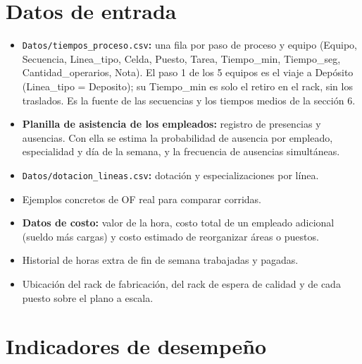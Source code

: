 \documentclass[11pt,a4paper]{article}
\begin{document}
\section{Datos de entrada}

\begin{itemize}
  \item \texttt{Datos/\allowbreak{}tiempos\_\allowbreak{}proceso.csv}\textbf{:} una fila por paso de proceso y equipo (Equipo, Secuencia, Linea\_tipo, Celda, Puesto, Tarea, Tiempo\_min, Tiempo\_seg, Cantidad\_operarios, Nota). El paso 1 de los 5 equipos es el viaje a Depósito (Linea\_tipo = Deposito); su Tiempo\_min es solo el retiro en el rack, sin los traslados. Es la fuente de las secuencias y los tiempos medios de la sección 6.
  \item \textbf{Planilla de asistencia de los empleados:} registro de presencias y ausencias. Con ella se estima la probabilidad de ausencia por empleado, especialidad y día de la semana, y la frecuencia de ausencias simultáneas.
  \item \texttt{Datos/\allowbreak{}dotacion\_\allowbreak{}lineas.csv}\textbf{:} dotación y especializaciones por línea.
\end{itemize}

\begin{itemize}
  \item Ejemplos concretos de OF real para comparar corridas.
  \item \textbf{Datos de costo:} valor de la hora, costo total de un empleado adicional (sueldo más cargas) y costo estimado de reorganizar áreas o puestos.
  \item Historial de horas extra de fin de semana trabajadas y pagadas.
  \item Ubicación del rack de fabricación, del rack de espera de calidad y de cada puesto sobre el plano a escala.
\end{itemize}

\section{Indicadores de desempeño}
\end{document}
